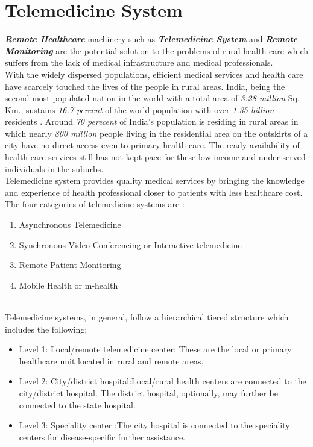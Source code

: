 \documentclass[12pt]{article}
\begin{document}
\section{Telemedicine System}
\textbf{\emph{Remote Healthcare}} machinery such as \textbf{\emph{ Telemedicine  System }}and \textbf{\emph {Remote Monitoring}} are the potential solution to the problems of rural health care which suffers from the lack of medical infrastructure and medical professionals.\newline\\
 With the widely dispersed populations, efficient medical services and health care have scarcely touched the lives of the people in rural areas. India, being the second-most populated nation in the world with a total area of \emph{3.28 million} Sq. Km., sustains \emph{16.7 percent }  of the world population with over \emph{1.35 billion} residents . Around \emph{70 perecent}  of India's population is residing in rural areas in which nearly \emph{800 million} people living in the residential area on the outskirts of a city have no direct access even to primary health care. The ready availability of health care services still has not kept pace for these low-income and under-served individuals in the suburbs.\newline\\
 Telemedicine  system provides quality medical services by bringing the knowledge and experience of health professional closer to patients with less healthcare cost. The four categories of telemedicine systems are :-
 \begin{enumerate}
 \item Asynchronous Telemedicine 
 \item Synchronous Video Conferencing or Interactive telemedicine
 \item Remote Patient Monitoring 
 \item Mobile Health or m-health
 \end{enumerate}\\
Telemedicine systems, in general, follow a hierarchical tiered structure which includes the following:
\begin{itemize}
\item Level 1: Local/remote telemedicine center: These are the local or primary healthcare unit located in rural and remote areas.
\item Level 2: City/district hospital:Local/rural health centers are connected to the city/district hospital. The district hospital, optionally, may further be connected to the state hospital.
\item Level 3: Speciality center :The city hospital is connected to the speciality centers for disease-specific further assistance.
\end{itemize}\\
\end{document}
